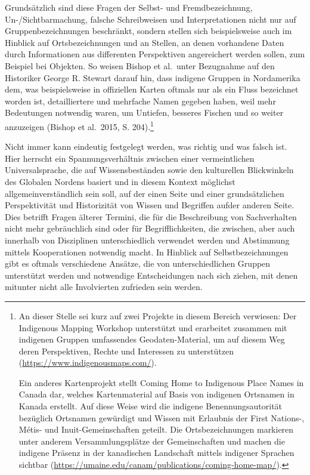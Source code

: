 \documentclass[a4paper,
fontsize=11pt,
oneside,
numbers=noperiodatend,
parskip=half-,
bibliography=totoc,
final
]{scrartcl}
\begin{document}
Grundsätzlich sind diese Fragen der Selbst- und Fremdbezeichnung,
Un-/Sichtbarmachung, falsche Schreibweisen und Interpretationen nicht
nur auf Gruppenbezeichnungen beschränkt, sondern stellen sich
beispielsweise auch im Hinblick auf Ortsbezeichnungen und an Stellen, an
denen vorhandene Daten durch Informationen aus differenten Perspektiven
angereichert werden sollen, zum Beispiel bei Objekten. So weisen Bishop
et al.~unter Bezugnahme auf den Historiker George R. Stewart darauf hin,
dass indigene Gruppen in Nordamerika dem, was beispielsweise in
offiziellen Karten oftmals nur als ein Fluss bezeichnet worden ist,
detailliertere und mehrfache Namen gegeben haben, weil mehr Bedeutungen
notwendig waren, um Untiefen, besseres Fischen und so weiter anzuzeigen
(Bishop et al.~2015, S. 204).\footnote{An dieser Stelle sei kurz auf
  zwei Projekte in diesem Bereich verwiesen: Der Indigenous Mapping
  Workshop unterstützt und erarbeitet zusammen mit indigenen Gruppen
  umfassendes Geodaten-Material, um auf diesem Weg deren Perspektiven,
  Rechte und Interessen zu unterstützen
  (\url{https://www.indigenousmaps.com/}).

  Ein anderes Kartenprojekt stellt Coming Home to Indigenous Place Names
  in Canada dar, welches Kartenmaterial auf Basis von indigenen
  Ortsnamen in Kanada erstellt. Auf diese Weise wird die indigene
  Benennungsautorität bezüglich Ortsnamen gewürdigt und Wissen mit
  Erlaubnis der First Nations-, Métis- und Inuit-Gemeinschaften geteilt.
  Die Ortsbezeichnungen markieren unter anderem Versammlungsplätze der
  Gemeinschaften und machen die indigene Präsenz in der kanadischen
  Landschaft mittels indigener Sprachen sichtbar
  (\url{https://umaine.edu/canam/publications/coming-home-map/}).}

Nicht immer kann eindeutig festgelegt werden, was richtig und was falsch
ist. Hier herrscht ein Spannungsverhältnis zwischen einer vermeintlichen
Universalsprache, die auf Wissensbeständen sowie den kulturellen
Blickwinkeln des Globalen Nordens basiert und in diesem Kontext
möglichst allgemeinverständlich sein soll, auf der einen Seite und einer
grundsätzlichen Perspektivität und Historizität von Wissen und Begriffen
aufder anderen Seite. Dies betrifft Fragen älterer Termini, die für die
Beschreibung von Sachverhalten nicht mehr gebräuchlich sind oder für
Begrifflichkeiten, die zwischen, aber auch innerhalb von Disziplinen
unterschiedlich verwendet werden und Abstimmung mittels Kooperationen
notwendig macht. In Hinblick auf Selbstbezeichnungen gibt es oftmals
verschiedene Ansätze, die von unterschiedlichen Gruppen unterstützt
werden und notwendige Entscheidungen nach sich ziehen, mit denen
mitunter nicht alle Involvierten zufrieden sein werden.
\end{document}
